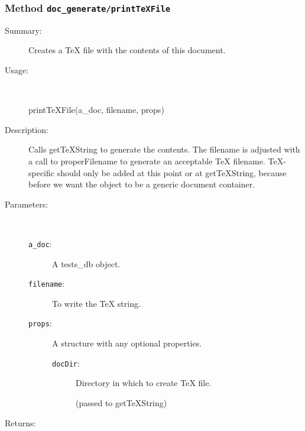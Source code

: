 \subsubsection[Method \texttt{printTeXFile}]{Method \texttt{doc\_generate/printTeXFile}}%
%
\label{ref_doc_generate__printTeXFile}%
\hypertarget{ref_doc_generate__printTeXFile}{}%
\begin{description}
\item[Summary:]Creates a TeX file with the contents of this document.
%
\item[Usage:]~%
\begin{lyxcode}%
printTeXFile(a\_doc, filename, props)
%
\end{lyxcode}%
%
\item[Description:]%
Calls getTeXString to generate the contents. The filename is adjusted with 
 a call to properFilename to generate an acceptable TeX filename. TeX-specific
 should only be added at this point or at getTeXString, because before we want
 the object to be a generic document container.
\item[Parameters:]~
\begin{description}%
\item[\texttt{a\_doc}:]
 A tests\_db object.
\item[\texttt{filename}:]
 To write the TeX string.
\item[\texttt{props}:]
 A structure with any optional properties.
\begin{description}%
\item[\texttt{docDir}:]
 Directory in which to create TeX file.

(passed to getTeXString)
\end{description}%
\end{description}%
%
\item[Returns:
]~


\end{description}
